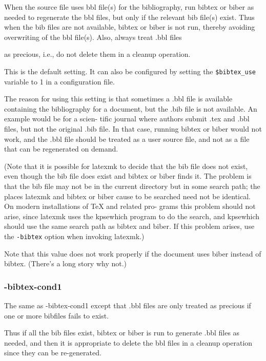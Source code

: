 When  the source file uses bbl file(s) for the bibliography, run
bibtex or biber as needed to regenerate the bbl files, but  only
if  the relevant bib file(s) exist.  Thus when the bib files are
not available, bibtex or biber  is  not  run,  thereby  avoiding
overwriting  of  the bbl file(s).  Also, always treat .bbl files

as precious, i.e., do not delete them in a cleanup operation.

This is the default setting.  It can also be configured by  setting the
\verb|$bibtex_use| variable to 1 in a configuration file.

The  reason for using this setting is that sometimes a .bbl file is available
containing the bibliography for a document, but the .bib  file  is  not
available.  An example would be for a scien- tific journal where authors submit
.tex and .bbl files, but  not the  original  .bib file.  In that case, running
bibtex or biber would not work, and the .bbl file should be treated  as  a
user source  file,  and  not as a file that can be regenerated on demand.

(Note that it is possible for latexmk to  decide  that  the  bib file  does
not  exist,  even though the bib file does exist and bibtex or biber finds it.
The problem is that the bib file  may not  be  in  the  current directory but
in some search path; the places latexmk and bibtex or biber cause to be
searched need not be  identical.   On modern installations of TeX and related
pro- grams this problem should not  arise,  since  latexmk  uses  the kpsewhich
program to do the search, and kpsewhich should use the same search path as
bibtex and biber.  If this  problem  arises, use the \verb|-bibtex| option when
invoking latexmk.)

Note that this value does not work properly if the document uses biber instead
of bibtex.  (There's a long story why not.)


\subsubsection{-bibtex-cond1}

The same as  -bibtex-cond1  except  that  .bbl  files  are  only
treated as precious if one or more bibfiles fails to exist.

Thus  if all the bib files exist, bibtex or biber is run to generate .bbl
files as needed, and then it is appropriate to delete the bbl files in a
cleanup operation since they can be re-generated.

